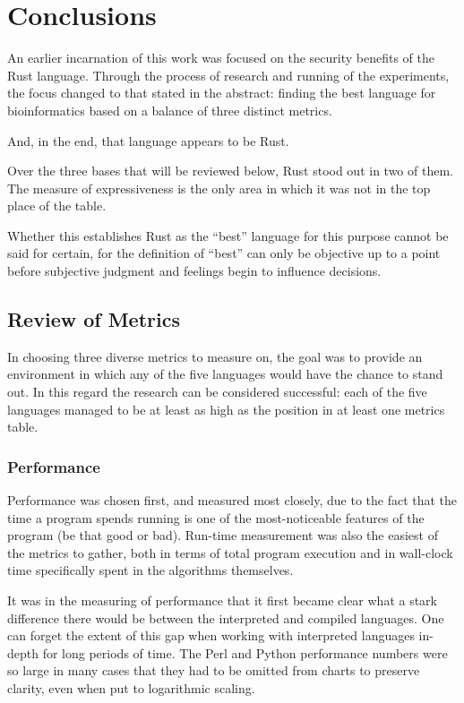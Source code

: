 \section{Conclusions}
\label{sec:conclusions}

An earlier incarnation of this work was focused on the security benefits of the Rust language. Through the process of research and running of the experiments, the focus changed to that stated in the abstract: finding the best language for bioinformatics based on a balance of three distinct metrics.

And, in the end, that language appears to be Rust.

Over the three bases that will be reviewed below, Rust stood out in two of them. The measure of expressiveness is the only area in which it was not in the top place of the table.

Whether this establishes Rust as the ``best'' language for this purpose cannot be said for certain, for the definition of ``best'' can only be objective up to a point before subjective judgment and feelings begin to influence decisions.

\subsection{Review of Metrics}

In choosing three diverse metrics to measure on, the goal was to provide an environment in which any of the five languages would have the chance to stand out. In this regard the research can be considered successful: each of the five languages managed to be at least as high as the  position in at least one metrics table.

\subsubsection{Performance}

Performance was chosen first, and measured most closely, due to the fact that the time a program spends running is one of the most-noticeable features of the program (be that good or bad). Run-time measurement was also the easiest of the metrics to gather, both in terms of total program execution and in wall-clock time specifically spent in the algorithms themselves.

It was in the measuring of performance that it first became clear what a stark difference there would be between the interpreted and compiled languages. One can forget the extent of this gap when working with interpreted languages in-depth for long periods of time. The Perl and Python performance numbers were so large in many cases that they had to be omitted from charts to preserve clarity, even when put to logarithmic scaling.

